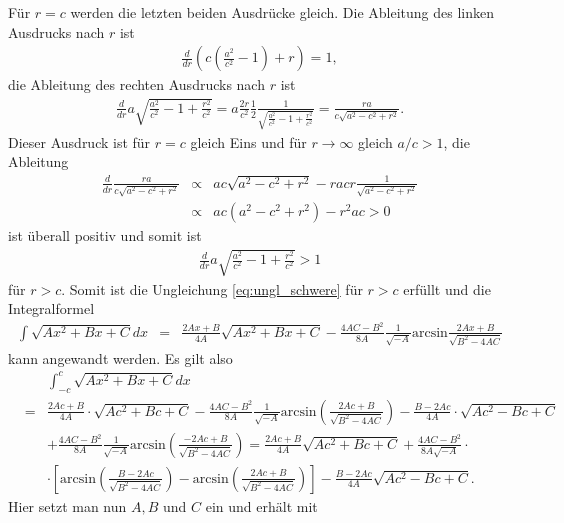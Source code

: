 \documentclass{book}
\renewcommand{\arcsin}{\text{arcsin}}
\begin{document}
%
Für $r = c$ werden die letzten beiden Ausdrücke gleich. Die Ableitung des linken Ausdrucks nach $r$ ist
%
\begin{eqnarray}
\frac{d}{dr}\left(c\left(\frac{a^2}{c^2} - 1\right) + r\right) = 1, 
\end{eqnarray}
%
die Ableitung des rechten Ausdrucks nach $r$ ist
%
\begin{eqnarray}
\frac{d}{dr}a\sqrt{\frac{a^2}{c^2} - 1 + \frac{r^2}{c^2}} = a\frac{2r}{c^2}\frac{1}{2}\frac{1}{\sqrt{\frac{a^2}{c^2} - 1 + \frac{r^2}{c^2}}} = \frac{ra}{c\sqrt{a^2 - c^2 + r^2}}.
\end{eqnarray}
%
Dieser Ausdruck ist für $r = c$ gleich Eins und für $r\to\infty$ gleich $a/c>1$, die Ableitung
%
\begin{eqnarray}
\frac{d}{dr}\frac{ra}{c\sqrt{a^2 - c^2 + r^2}}&\propto& ac\sqrt{a^2 - c^2 + r^2} - racr\frac{1}{\sqrt{a^2 - c^2 + r^2}}\nonumber\\
&\propto&ac\left(a^2 - c^2 + r^2\right) - r^2ac > 0
\end{eqnarray}
%
ist überall positiv und somit ist
%
\begin{eqnarray}
\frac{d}{dr}a\sqrt{\frac{a^2}{c^2} - 1 + \frac{r^2}{c^2}}>1
\end{eqnarray}
%
für $r>c$.
Somit ist die Ungleichung \eqref{eq:ungl_schwere} für $r> c$ erfüllt und die Integralformel
%
\begin{eqnarray}
\int\sqrt{Ax^2 + Bx + C}dx & = & \frac{2Ax + B}{4A}\sqrt{Ax^2 + Bx + C} - \frac{4AC - B^2}{8A}\frac{1}{\sqrt{ - A}}\arcsin\frac{2Ax + B}{\sqrt{B^2 - 4AC}}
\end{eqnarray}
%
kann angewandt werden. Es gilt also
%
\begin{eqnarray}
&&\int_{ - c}^{c}\sqrt{Ax^2 + Bx + C}dx\nonumber\\
& = & \frac{2Ac + B}{4A}\cdot\sqrt{Ac^2 + Bc + C} - \frac{4AC - B^2}{8A}\frac{1}{\sqrt{ - A}}\arcsin\left(\frac{2Ac + B}{\sqrt{B^2 - 4AC}}\right)
- \frac{B - 2Ac}{4A}\cdot\sqrt{Ac^2 - Bc + C}\nonumber\\
&&+ \frac{4AC - B^2}{8A}\frac{1}{\sqrt{ - A}}\arcsin\left(\frac{ - 2Ac + B}{\sqrt{B^2 - 4AC}}\right) = \frac{2Ac + B}{4A}\sqrt{Ac^2 + Bc + C} + \frac{4AC - B^2}{8A\sqrt{ - A}}\cdot\nonumber\\
&&\cdot\left[\arcsin\left(\frac{B - 2Ac}{\sqrt{B^2 - 4AC}}\right) - \arcsin\left(\frac{2Ac + B}{\sqrt{B^2 - 4AC}}\right)\right] - \frac{B - 2Ac}{4A}\sqrt{Ac^2 - Bc + C}.
\end{eqnarray}
%
Hier setzt man nun $A, B$ und $C$ ein und erhält mit
%
\end{document}
